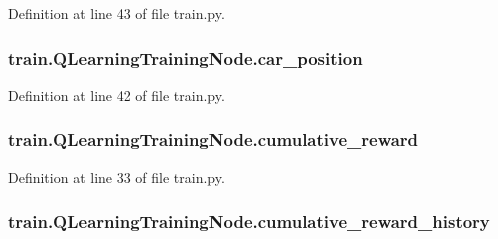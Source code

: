 Definition at line 43 of file train.\+py.

\subsubsection[{\texorpdfstring{car\+\_\+position}{car_position}}]{\setlength{\rightskip}{0pt plus 5cm}train.\+Q\+Learning\+Training\+Node.\+car\+\_\+position}\hypertarget{classtrain_1_1_q_learning_training_node_ac802eca257307ce6c83897c612aa5f90}{}\label{classtrain_1_1_q_learning_training_node_ac802eca257307ce6c83897c612aa5f90}


Definition at line 42 of file train.\+py.

\subsubsection[{\texorpdfstring{cumulative\+\_\+reward}{cumulative_reward}}]{\setlength{\rightskip}{0pt plus 5cm}train.\+Q\+Learning\+Training\+Node.\+cumulative\+\_\+reward}\hypertarget{classtrain_1_1_q_learning_training_node_a4c632e44085797e564501bba836b7359}{}\label{classtrain_1_1_q_learning_training_node_a4c632e44085797e564501bba836b7359}


Definition at line 33 of file train.\+py.

\subsubsection[{\texorpdfstring{cumulative\+\_\+reward\+\_\+history}{cumulative_reward_history}}]{\setlength{\rightskip}{0pt plus 5cm}train.\+Q\+Learning\+Training\+Node.\+cumulative\+\_\+reward\+\_\+history}\hypertarget{classtrain_1_1_q_learning_training_node_aa25b9712eebb6aed6befa421814472b4}{}\label{classtrain_1_1_q_learning_training_node_aa25b9712eebb6aed6befa421814472b4}


